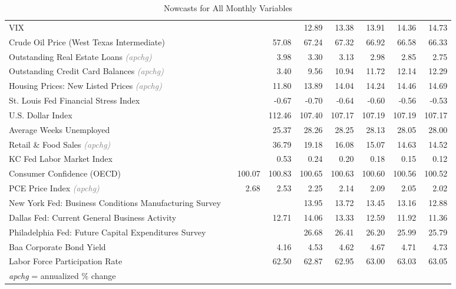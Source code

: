 \documentclass[11pt, letterpaper]{article}\usepackage[]{graphicx}\usepackage[]{color}
\begin{document}
\begin{table}[H]
\begin{tabular}{lrrrrrrrr}
  VIX &  &  &  & 12.89 & 13.38 & 13.91 & 14.36 & 14.73 \\ 
  Crude Oil Price (West Texas Intermediate) &  &  & 57.08 & 67.24 & 67.32 & 66.92 & 66.58 & 66.33 \\ 
  Outstanding Real Estate Loans \textit{\footnotesize\textcolor{gray}{(apchg)}} &  &  & 3.98 & 3.30 & 3.13 & 2.98 & 2.85 & 2.75 \\ 
  Outstanding Credit Card Balances \textit{\footnotesize\textcolor{gray}{(apchg)}} &  &  & 3.40 & 9.56 & 10.94 & 11.72 & 12.14 & 12.29 \\ 
  Housing Prices: New Listed Prices \textit{\footnotesize\textcolor{gray}{(apchg)}} &  &  & 11.80 & 13.89 & 14.04 & 14.24 & 14.46 & 14.69 \\ 
  St. Louis Fed Financial Stress Index &  &  & -0.67 & -0.70 & -0.64 & -0.60 & -0.56 & -0.53 \\ 
  U.S. Dollar Index &  &  & 112.46 & 107.40 & 107.17 & 107.19 & 107.19 & 107.17 \\ 
  Average Weeks Unemployed &  &  & 25.37 & 28.26 & 28.25 & 28.13 & 28.05 & 28.00 \\ 
  Retail \& Food Sales \textit{\footnotesize\textcolor{gray}{(apchg)}} &  &  & 36.79 & 19.18 & 16.08 & 15.07 & 14.63 & 14.52 \\ 
  KC Fed Labor Market Index &  &  & 0.53 & 0.24 & 0.20 & 0.18 & 0.15 & 0.12 \\ 
  Consumer Confidence (OECD) &  & 100.07 & 100.83 & 100.65 & 100.63 & 100.60 & 100.56 & 100.52 \\ 
  PCE Price Index \textit{\footnotesize\textcolor{gray}{(apchg)}} &  & 2.68 & 2.53 & 2.25 & 2.14 & 2.09 & 2.05 & 2.02 \\ 
  New York Fed: Business Conditions Manufacturing Survey &  &  &  & 13.95 & 13.72 & 13.45 & 13.16 & 12.88 \\ 
  Dallas Fed: Current General Business Activity &  &  & 12.71 & 14.06 & 13.33 & 12.59 & 11.92 & 11.36 \\ 
  Philadelphia Fed: Future Capital Expenditures Survey &  &  &  & 26.68 & 26.41 & 26.20 & 25.99 & 25.79 \\ 
  Baa Corporate Bond Yield &  &  & 4.16 & 4.53 & 4.62 & 4.67 & 4.71 & 4.73 \\ 
  Labor Force Participation Rate &  &  & 62.50 & 62.87 & 62.95 & 63.00 & 63.03 & 63.05 \\ 
   \hline 
 \textit{apchg} = annualized \% change 
\end{tabular}
\endgroup
\caption{Nowcasts for All Monthly Variables} 
\end{table}
\end{document}
